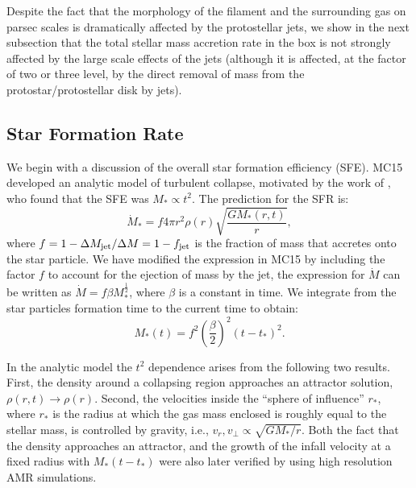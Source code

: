 \documentclass[../dissertation.tex]{subfiles}
\begin{document}
Despite the fact that the morphology of the filament and the surrounding gas on parsec scales is dramatically affected by the protostellar jets, we show in the next subsection that the total stellar mass accretion rate in the box is not strongly affected by the large scale effects of the jets (although it is affected, at the factor of two or three level, by the direct removal of mass from the protostar/protostellar disk by jets).

\subsection{Star Formation Rate}\label{subsec:jet_SFR}
We begin with a discussion of the overall star formation efficiency (SFE).
MC15 developed an analytic model of turbulent collapse, motivated by the work of \citet{2015ApJ...800...49L}, who found that the SFE was $M_*\propto t^2$.
The prediction for the SFR is:
\begin{equation}
\dot{M}_* = f 4\pi r^2 \rho(r) \sqrt{\frac{GM_*(r,t)}{r}},
\label{eq:jet_mass_accretion}
\end{equation}
where $f = 1 - \Delta M_{\rm jet} / \Delta M = 1 - f_{\rm jet}$ is the fraction of mass that accretes onto the star particle.
We have modified the expression in MC15 by including the factor $f$ to account for the ejection of mass by the jet, the expression for $\dot{M}$ can be written as $\dot{M} = f \beta M_*^{\frac{1}{2}}$, where $\beta$ is a constant in time.
We integrate from the star particles formation time to the current time to obtain:
\begin{equation}
M_*(t) = f^2 \left( \frac{\beta}{2} \right)^2 (t-t_*)^2.
\label{eq:jet_mass_ratio}
\end{equation}

In the analytic model the $t^2$ dependence arises from the following two results.
First, the density around a collapsing region approaches an attractor solution, $\rho(r,t) \rightarrow \rho(r)$.
Second, the velocities inside the ``sphere of influence'' $r_*$, where $r_*$ is the radius at which the gas mass enclosed is roughly equal to the stellar mass, is controlled by gravity, i.e., $v_r, v_{\perp} \propto \sqrt{GM_*/r}$.
Both the fact that the density approaches an attractor, and the growth of the infall velocity at a fixed radius with $M_*(t-t_*)$  were also later verified by \citet{2017MNRAS.465.1316M} using high resolution AMR simulations.
\end{document}

